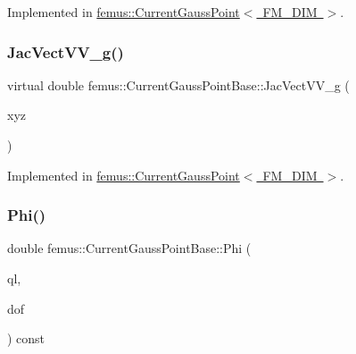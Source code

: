 Implemented in \mbox{\hyperlink{classfemus_1_1_current_gauss_point_afa303733709a133cb86ba65fe70d4a31}{femus\+::\+Current\+Gauss\+Point$<$ F\+M\+\_\+\+D\+I\+M $>$}}.

\mbox{\label{classfemus_1_1_current_gauss_point_base_ac8f11d39a5d6b88c69849f2820a97482}} 
\subsubsection{\texorpdfstring{Jac\+Vect\+V\+V\+\_\+g()}{JacVectVV\_g()}}
{\footnotesize\ttfamily virtual double femus\+::\+Current\+Gauss\+Point\+Base\+::\+Jac\+Vect\+V\+V\+\_\+g (\begin{DoxyParamCaption}\item[{\mbox{\hyperlink{classfemus_1_1_current_quantity}{Current\+Quantity}} \&}]{xyz }\end{DoxyParamCaption})\hspace{0.3cm}{\ttfamily [pure virtual]}}



Implemented in \mbox{\hyperlink{classfemus_1_1_current_gauss_point_a96a47ebb8abd928f0db6e472db2811f1}{femus\+::\+Current\+Gauss\+Point$<$ F\+M\+\_\+\+D\+I\+M $>$}}.

\mbox{\label{classfemus_1_1_current_gauss_point_base_ae82c1cf31e3f5fdf7eea0e79c963ecba}} 
\subsubsection{\texorpdfstring{Phi()}{Phi()}}
{\footnotesize\ttfamily double femus\+::\+Current\+Gauss\+Point\+Base\+::\+Phi (\begin{DoxyParamCaption}\item[{const \mbox{\hyperlink{_typedefs_8hpp_a91ad9478d81a7aaf2593e8d9c3d06a14}{uint}}}]{ql,  }\item[{const \mbox{\hyperlink{_typedefs_8hpp_a91ad9478d81a7aaf2593e8d9c3d06a14}{uint}}}]{dof }\end{DoxyParamCaption}) const\hspace{0.3cm}{\ttfamily [inline]}}

